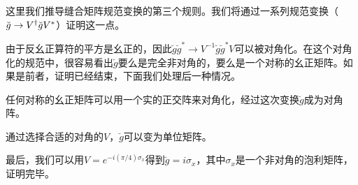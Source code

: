 \begin{appendices}
这里我们推导缝合矩阵规范变换的第三个规则。我们将通过一系列规范变换（$\breve{g}\rightarrow V^{\scriptstyle{\dagger}}\breve{g}V^*$）证明这一点。

 由于反幺正算符的平方是幺正的，因此$\breve{g}\breve{g}^* \rightarrow V^{-1}\breve{g}\breve{g}^*V$可以被对角化。在这个对角化的规范中，很容易看出$\breve{g}$要么是完全非对角的，要么是一个对称的幺正矩阵。如果是前者，证明已经结束，下面我们处理后一种情况。

 任何对称的幺正矩阵可以用一个实的正交阵来对角化，经过这次变换$\breve{g}$成为对角阵。

 通过选择合适的对角的$V$，$\breve{g}$可以变为单位矩阵。

 最后，我们可以用$V=e^{-i(\pi/4)\sigma_x}$得到$\breve{g}=i\sigma_x$，其中$\sigma_x$是一个非对角的泡利矩阵，证明完毕。\\

\end{appendices}

